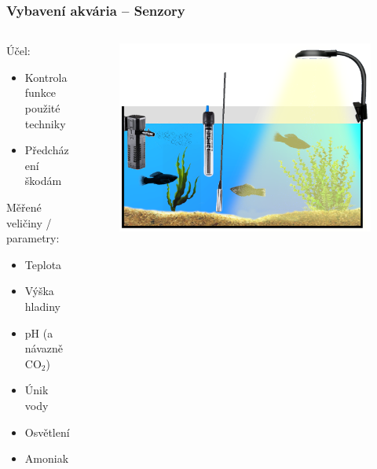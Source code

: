 \documentclass[%
  12pt,       				%
	t,                  %
	aspectratio=1610,   %
	unicode,						%
]{beamer}				    	%
\begin{document}
\begin{frame} 
	\frametitle{Vybavení akvária -- Senzory}
	
	\begin{columns}[T] 								%
		\begin{column}{0.4\textwidth}		%
			Účel:\\[0ex]
			\begin{itemize}
				\item Kontrola funkce použité techniky
				\item Předcházení škodám
			\end{itemize}

			\vspace{2ex}%
			Měřené veličiny / parametry:\\[0ex]
			\begin{itemize}
				\item Teplota 
				\item Výška hladiny
				\item pH (a návazně CO\(_{2}\))
				\item Únik vody
				\item Osvětlení
				\item Amoniak
			\end{itemize}
		\end{column}
		\begin{column}{0.6\textwidth}		%
			\begin{figure}%
				\centering
				\includegraphics[width=\columnwidth]{obrazky/prezentace/vybaveni-akvaria/06-sensory.png}
			\end{figure}
		\end{column}
	\end{columns}											%
\end{frame}
\end{document}
